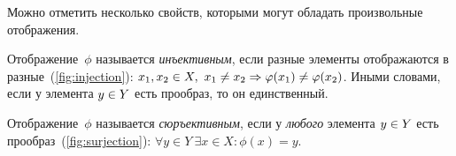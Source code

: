 \documentclass[a4paper,12pt]{article}
\begin{document}
  
  Можно отметить несколько свойств, которыми могут обладать произвольные отображения.
  
  \begin{definition}
    Отображение~$\phi$ называется \emph{инъективным}, если разные элементы отображаются в разные~(\ref{fig:injection}):
    $
      x_1, x_2 \hm\in X,\ x_1 \hm{\not=} x_2 \hm\Rightarrow \phi(x_1) \hm{\not=} \phi(x_2)
    $.
    Иными словами, если у элемента $y \hm\in Y$ есть прообраз, то он единственный.
  \end{definition}
  
  \begin{definition}
    Отображение~$\phi$ называется \emph{сюръективным}, если у \emph{любого} элемента $y \hm\in Y$ есть прообраз~(\ref{fig:surjection}):
    $
      \forall y \in Y\ \exists x \in X\colon \phi(x) = y
    $.
  \end{definition}
  
\end{document}

